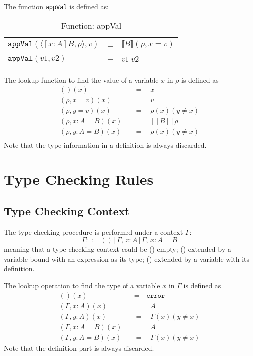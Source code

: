 The function \texttt{appVal} is defined as:
\begin{table}[h]
  \centering
  \begin{tabular}{l l l}
    $\texttt{appVal}(\langle [x : A]B, \rho \rangle, v)$ & = & $\llbracket B \rrbracket (\rho, x = v)$  \\
    $\texttt{appVal}(v1, v2)$ & = & $v1 \; v2$
  \end{tabular}
  \caption{Function: appVal}
\end{table}

The lookup function to find the value of a variable $x$ in $\rho$ is defined as
\begin{align*}
  ()(x) \quad &= \quad x \\
  (\rho, x = v)(x) \quad &= \quad v \\
  (\rho, y = v)(x) \quad &= \quad \rho(x)(y \neq x) \\
  (\rho, x : A = B)(x) \quad &= \quad [\![B]\!]\rho \\
  (\rho, y : A = B)(x) \quad &= \quad \rho(x)(y \neq x) \\
\end{align*}
Note that the type information in a definition is always discarded.

\section{Type Checking Rules}
\subsection{Type Checking Context}
The type checking procedure is performed under a context $\Gamma$:
\[
  \Gamma ::= ()\,|\,\Gamma,\,x : A\,|\,\Gamma,\,x : A = B
\]
meaning that a type checking context could be () empty; () extended by a variable bound with an expression as its type; () extended by a variable with its definition.

The lookup operation to find the type of a variable $x$ in $\Gamma$ is defined as
\begin{align*}
  ()(x) \quad &= \quad \texttt{error} \\
  (\Gamma, x : A)(x) \quad &= \quad A \\
  (\Gamma, y : A)(x) \quad &= \quad \Gamma(x)(y \neq x) \\
  (\Gamma, x : A = B)(x) \quad &= \quad A \\
  (\Gamma, y : A = B)(x) \quad &= \quad \Gamma(x)(y \neq x) 
\end{align*}
Note that the definition part is always discarded.

